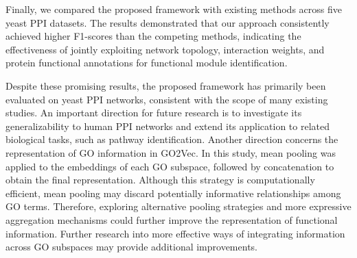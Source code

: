 Finally, we compared the proposed framework with existing methods across five yeast PPI datasets. The results demonstrated that our approach consistently achieved higher F1-scores than the competing methods, indicating the effectiveness of jointly exploiting network topology, interaction weights, and protein functional annotations for functional module identification.

Despite these promising results, the proposed framework has primarily been evaluated on yeast PPI networks, consistent with the scope of many existing studies. An important direction for future research is to investigate its generalizability to human PPI networks and extend its application to related biological tasks, such as pathway identification. Another direction concerns the representation of GO information in GO2Vec. In this study, mean pooling was applied to the embeddings of each GO subspace, followed by concatenation to obtain the final representation. Although this strategy is computationally efficient, mean pooling may discard potentially informative relationships among GO terms. Therefore, exploring alternative pooling strategies and more expressive aggregation mechanisms could further improve the representation of functional information. Further research into more effective ways of integrating information across GO subspaces may provide additional improvements.